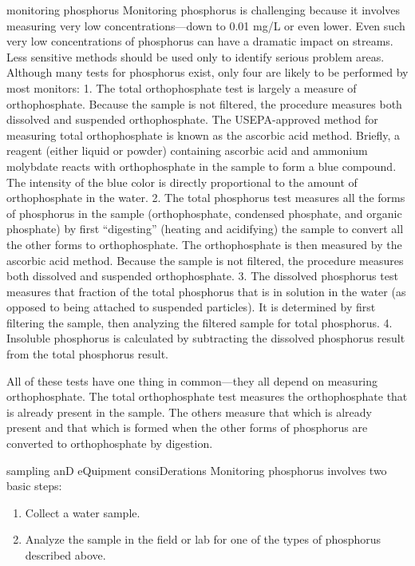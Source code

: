 \documentclass{article}
\begin{document}
monitoring phosphorus Monitoring phosphorus is challenging because it
involves measuring very low concentrations---down to 0.01 mg/L or even
lower. Even such very low concentrations of phosphorus can have a
dramatic impact on streams. Less sensitive methods should be used only
to identify serious problem areas. Although many tests for phosphorus
exist, only four are likely to be performed by most monitors: 1. The
total orthophosphate test is largely a measure of orthophosphate.
Because the sample is not filtered, the procedure measures both
dissolved and suspended orthophosphate. The USEPA-approved method for
measuring total orthophosphate is known as the ascorbic acid method.
Briefly, a reagent (either liquid or powder) containing ascorbic acid
and ammonium molybdate reacts with orthophosphate in the sample to form
a blue compound. The intensity of the blue color is directly
proportional to the amount of orthophosphate in the water. 2. The total
phosphorus test measures all the forms of phosphorus in the sample
(orthophosphate, condensed phosphate, and organic phosphate) by first
``digesting'' (heating and acidifying) the sample to convert all the
other forms to orthophosphate. The orthophosphate is then measured by
the ascorbic acid method. Because the sample is not filtered, the
procedure measures both dissolved and suspended orthophosphate. 3. The
dissolved phosphorus test measures that fraction of the total phosphorus
that is in solution in the water (as opposed to being attached to
suspended particles). It is determined by first filtering the sample,
then analyzing the filtered sample for total phosphorus. 4. Insoluble
phosphorus is calculated by subtracting the dissolved phosphorus result
from the total phosphorus result.

All of these tests have one thing in common---they all depend on
measuring orthophosphate. The total orthophosphate test measures the
orthophosphate that is already present in the sample. The others measure
that which is already present and that which is formed when the other
forms of phosphorus are converted to orthophosphate by digestion.

sampling anD eQuipment consiDerations Monitoring phosphorus involves two
basic steps:

\begin{enumerate}
\def\labelenumi{\arabic{enumi}.}
\tightlist
\item
  Collect a water sample.
\item
  Analyze the sample in the field or lab for one of the types of
  phosphorus described above.
\end{enumerate}
\end{document}
